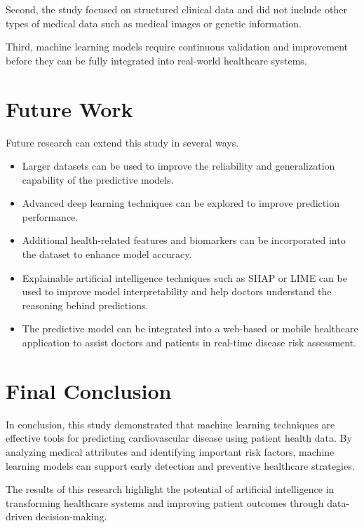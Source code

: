 Second, the study focused on structured clinical data and did not include other types of medical data such as medical images or genetic information.

Third, machine learning models require continuous validation and improvement before they can be fully integrated into real-world healthcare systems.

\section{Future Work}

Future research can extend this study in several ways.

\begin{itemize}
\item Larger datasets can be used to improve the reliability and generalization capability of the predictive models.
\item Advanced deep learning techniques can be explored to improve prediction performance.
\item Additional health-related features and biomarkers can be incorporated into the dataset to enhance model accuracy.
\item Explainable artificial intelligence techniques such as SHAP or LIME can be used to improve model interpretability and help doctors understand the reasoning behind predictions.
\item The predictive model can be integrated into a web-based or mobile healthcare application to assist doctors and patients in real-time disease risk assessment.
\end{itemize}

\section{Final Conclusion}

In conclusion, this study demonstrated that machine learning techniques are effective tools for predicting cardiovascular disease using patient health data. By analyzing medical attributes and identifying important risk factors, machine learning models can support early detection and preventive healthcare strategies.

The results of this research highlight the potential of artificial intelligence in transforming healthcare systems and improving patient outcomes through data-driven decision-making.
